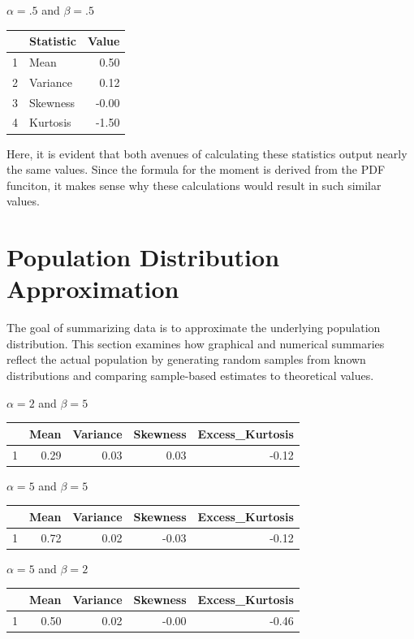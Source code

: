 \documentclass{article}\usepackage[]{graphicx}\usepackage[]{xcolor}
\begin{document}
\begin{multicols}{2}
$\alpha = .5$ and $\beta = .5$
\begin{table}[H]
\centering
\begin{tabular}{|c|l|r|}
  \hline
 & Statistic & Value \\ 
  \hline
  1 & Mean & 0.50 \\ 
  2 & Variance & 0.12 \\ 
  3 & Skewness & -0.00 \\ 
  4 & Kurtosis & -1.50 \\ 
   \hline
\end{tabular}
\end{table}

Here, it is evident that both avenues of calculating these statistics output nearly the same values. Since the formula for the moment is derived from the PDF funciton, it makes sense why these calculations would result in such similar values.


\section{Population Distribution Approximation}
The goal of summarizing data is to approximate the underlying population distribution. This section examines how graphical and numerical summaries reflect the actual population by generating random samples from known distributions and comparing sample-based estimates to theoretical values.

$\alpha = 2$ and $\beta = 5$
\begin{table}[H]
\centering
\begin{tabular}{rrrrr}
  \hline
 & Mean & Variance & Skewness & Excess\_Kurtosis \\ 
  \hline
1 & 0.29 & 0.03 & 0.03 & -0.12 \\ 
   \hline
\end{tabular}
\end{table}

$\alpha = 5$ and $\beta = 5$
\begin{table}[H]
\centering
\begin{tabular}{rrrrr}
  \hline
 & Mean & Variance & Skewness & Excess\_Kurtosis \\ 
  \hline
1 & 0.72 & 0.02 & -0.03 & -0.12 \\ 
   \hline
\end{tabular}
\end{table}

$\alpha = 5$ and $\beta = 2$
\begin{table}[H]
\centering
\begin{tabular}{rrrrr}
  \hline
 & Mean & Variance & Skewness & Excess\_Kurtosis \\ 
  \hline
1 & 0.50 & 0.02 & -0.00 & -0.46 \\ 
   \hline
\end{tabular}
\end{table}
 

\end{multicols}
\end{document}

